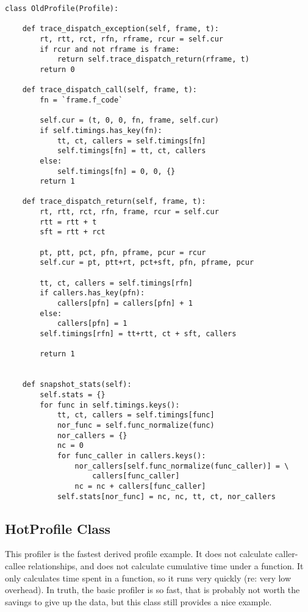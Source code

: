 \begin{verbatim}
class OldProfile(Profile):

    def trace_dispatch_exception(self, frame, t):
        rt, rtt, rct, rfn, rframe, rcur = self.cur
        if rcur and not rframe is frame:
            return self.trace_dispatch_return(rframe, t)
        return 0

    def trace_dispatch_call(self, frame, t):
        fn = `frame.f_code`
        
        self.cur = (t, 0, 0, fn, frame, self.cur)
        if self.timings.has_key(fn):
            tt, ct, callers = self.timings[fn]
            self.timings[fn] = tt, ct, callers
        else:
            self.timings[fn] = 0, 0, {}
        return 1

    def trace_dispatch_return(self, frame, t):
        rt, rtt, rct, rfn, frame, rcur = self.cur
        rtt = rtt + t
        sft = rtt + rct

        pt, ptt, pct, pfn, pframe, pcur = rcur
        self.cur = pt, ptt+rt, pct+sft, pfn, pframe, pcur

        tt, ct, callers = self.timings[rfn]
        if callers.has_key(pfn):
            callers[pfn] = callers[pfn] + 1
        else:
            callers[pfn] = 1
        self.timings[rfn] = tt+rtt, ct + sft, callers

        return 1


    def snapshot_stats(self):
        self.stats = {}
        for func in self.timings.keys():
            tt, ct, callers = self.timings[func]
            nor_func = self.func_normalize(func)
            nor_callers = {}
            nc = 0
            for func_caller in callers.keys():
                nor_callers[self.func_normalize(func_caller)] = \
                    callers[func_caller]
                nc = nc + callers[func_caller]
            self.stats[nor_func] = nc, nc, tt, ct, nor_callers
\end{verbatim}

\subsection{HotProfile Class \label{profile-HotProfile}}

This profiler is the fastest derived profile example.  It does not
calculate caller-callee relationships, and does not calculate
cumulative time under a function.  It only calculates time spent in a
function, so it runs very quickly (re: very low overhead).  In truth,
the basic profiler is so fast, that is probably not worth the savings
to give up the data, but this class still provides a nice example.

